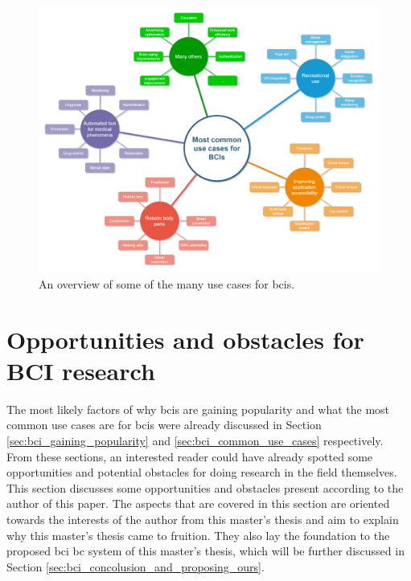 \begin{figure}[ht]
    \centering
    \includegraphics[width=\linewidth]{../images/introduction/use_cases_overview.pdf}
    \captionsetup{width=0.7\linewidth}
    \captionsetup{justification=centering}
    \caption{An overview of some of the many use cases for \glspl{bci}.} 
    \label{fig:bci_use_cases_diagram}
\end{figure}



\section{Opportunities and obstacles for BCI research}
\label{sec:bci_opportunities_obstacles}

The most likely factors of why \glspl{bci} are gaining popularity and what the most common use cases are for \glspl{bci} were already discussed in Section \ref{sec:bci_gaining_popularity} and \ref{sec:bci_common_use_cases} respectively.
From these sections, an interested reader could have already spotted some opportunities and potential obstacles for doing research in the field themselves.
This section discusses some opportunities and obstacles present according to the author of this paper.
The aspects that are covered in this section are oriented towards the interests of the author from this master's thesis and aim to explain why this master's thesis came to fruition.
They also lay the foundation to the proposed \gls{bci} \gls{bc} system of this master's thesis, which will be further discussed in Section \ref{sec:bci_concolusion_and_proposing_ours}.


